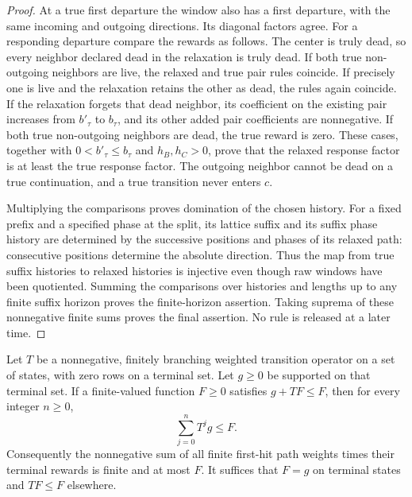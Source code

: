 \begin{proof}
At a true first departure the window also has a first departure,
with the same incoming and outgoing directions. Its diagonal factors
agree. For a responding departure compare the rewards as follows.
The center is truly dead, so every neighbor declared dead in the
relaxation is truly dead. If both true non-outgoing neighbors are
live, the relaxed and true pair rules coincide. If precisely one is
live and the relaxation retains the other as dead, the rules again
coincide. If the relaxation forgets that dead neighbor, its
coefficient on the existing pair increases from \(b'_\tau\) to
\(b_\tau\), and its other added pair coefficients are nonnegative.
If both true non-outgoing neighbors are dead, the true reward is
zero. These cases, together with \(0<b'_\tau\le b_\tau\) and
\(h_B,h_C>0\), prove that the relaxed response factor is at least
the true response factor. The outgoing neighbor cannot be dead
on a true continuation, and a true transition never enters \(c\).

Multiplying the comparisons proves domination of the chosen
history. For a fixed prefix and a specified phase at the split,
its lattice suffix and its suffix phase history are determined by
the successive positions and phases of its relaxed path:
consecutive positions determine the absolute direction. Thus the
map from true suffix histories to relaxed histories is injective even
though raw windows have been quotiented. Summing the comparisons
over histories and lengths up to any finite suffix horizon proves
the finite-horizon assertion. Taking suprema of these nonnegative
finite sums proves the final assertion. No rule is released at a
later time.
\end{proof}

\begin{lemma}\label{l:Bellman-soundness}
Let \(T\) be a nonnegative, finitely branching weighted transition
operator on a set of states, with zero rows on a terminal set.
Let \(g\ge0\) be supported on that terminal set.
If a finite-valued function \(F\ge0\) satisfies
\(g+TF\le F\), then for every integer \(n\ge0\),
\[
 \sum_{j=0}^{n}T^jg\le F .
\]
Consequently the nonnegative sum of all finite first-hit path
weights times their terminal rewards is finite and at most \(F\).
It suffices that \(F=g\) on terminal states and \(TF\le F\)
elsewhere.
\end{lemma}

